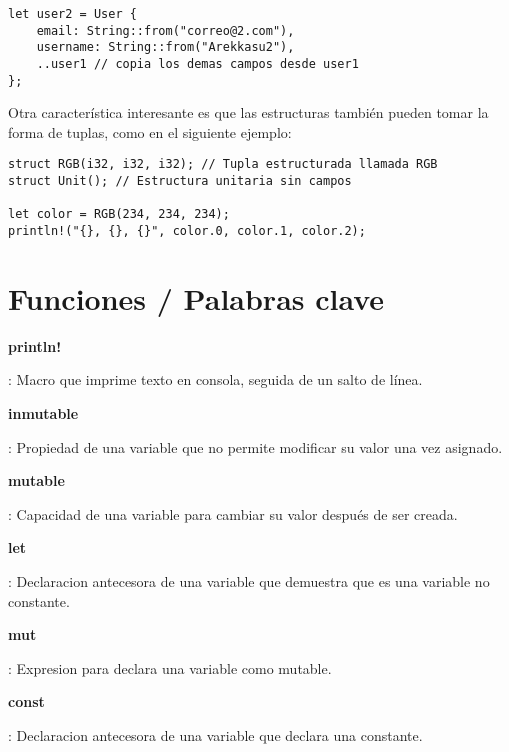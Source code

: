 \documentclass[12pt]{article}
\begin{document}
\begin{lstlisting}[style=ruststyle]
let user2 = User {
	email: String::from("correo@2.com"),
	username: String::from("Arekkasu2"),
	..user1 // copia los demas campos desde user1
};
\end{lstlisting}

Otra característica interesante es que las estructuras también pueden tomar la forma de tuplas, como en el siguiente ejemplo:

\begin{lstlisting}[style=ruststyle]
struct RGB(i32, i32, i32); // Tupla estructurada llamada RGB
struct Unit(); // Estructura unitaria sin campos

let color = RGB(234, 234, 234);
println!("{}, {}, {}", color.0, color.1, color.2);
\end{lstlisting}


	\newpage
	\section*{Funciones / Palabras clave}
	\hypertarget{println}{\textbf{println!}}: Macro que imprime texto en consola, seguida de un salto de línea.


	\hypertarget{inmutable}{\textbf{inmutable}}: Propiedad de una variable que no permite modificar su valor una vez asignado.


	\hypertarget{mutable}{\textbf{mutable}}: Capacidad de una variable para cambiar su valor después de ser creada.

	\hypertarget{let}{\textbf{let}}: Declaracion antecesora de una variable que demuestra que es una variable no constante.


	\hypertarget{mut}{\textbf{mut}}: Expresion para declara una variable como mutable.


	\hypertarget{const}{\textbf{const}}: Declaracion antecesora de una variable que declara una constante.
\end{document}
